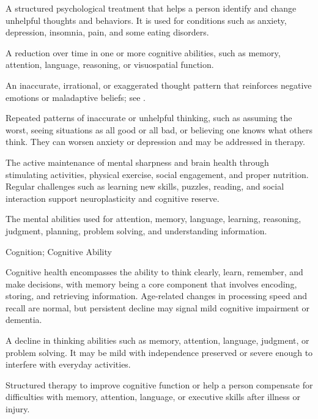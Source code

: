  A structured psychological treatment that helps a person identify and change unhelpful thoughts and behaviors. It is used for conditions such as anxiety, depression, insomnia, pain, and some eating disorders.

 A reduction over time in one or more cognitive abilities, such as memory, attention, language, reasoning, or visuospatial function.

 An inaccurate, irrational, or exaggerated thought pattern that reinforces negative emotions or maladaptive beliefs; see .

 Repeated patterns of inaccurate or unhelpful thinking, such as assuming the worst, seeing situations as all good or all bad, or believing one knows what others think. They can worsen anxiety or depression and may be addressed in therapy.

 The active maintenance of mental sharpness and brain health through stimulating
activities, physical exercise, social engagement, and proper nutrition. Regular
challenges such as learning new skills, puzzles, reading, and social interaction support
neuroplasticity and cognitive reserve.

 The mental abilities used for attention, memory, language, learning, reasoning, judgment, planning, problem solving, and understanding information.

\synonyms
Cognition; Cognitive Ability

 Cognitive health encompasses the ability to think clearly, learn, remember, and make
decisions, with memory being a core component that involves encoding, storing, and
retrieving information. Age-related changes in processing speed and recall are normal,
but persistent decline may signal mild cognitive impairment or dementia.

 A decline in thinking abilities such as memory, attention, language, judgment, or problem solving. It may be mild with independence preserved or severe enough to interfere with everyday activities.

 Structured therapy to improve cognitive function or help a person compensate for difficulties
with memory, attention, language, or executive skills after illness or injury.

